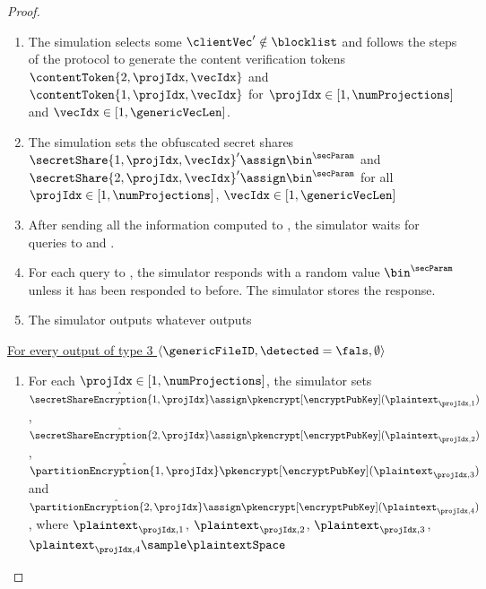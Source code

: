 \begin{proof}
\begin{enumerate}
\begin{enumerate}

\item The simulator sets $\hat{\secretShareEncryption{2, \projIdx}} \assign  \pkencrypt[\encryptPubKey](\plaintext_{\projIdx, 4})$  where $\plaintext_{\projIdx, 4} \sample \plaintextSpace$

\end{enumerate}
\item The simulation selects some $\clientVec' \notin \blocklist$ and follows the steps of the protocol to generate the content verification tokens $\contentToken{2, \projIdx, \vecIdx}$ and $\contentToken{1, \projIdx, \vecIdx}$ for $\projIdx \in [1, \numProjections]$ and $\vecIdx \in [1, \genericVecLen]$.  

\item The simulation sets the obfuscated secret shares $\secretShare{1, \projIdx, \vecIdx}' \assign \bin^{\secParam}$ and $\secretShare{2, \projIdx, \vecIdx}' \assign \bin^{\secParam}$ for all $\projIdx \in [1, \numProjections]$, $\vecIdx \in [1, \genericVecLen]$



\item After sending all the information computed to \server, the simulator waits for queries to \primeRO and \ro. 


\item For each query to \ro, the simulator responds with a random value $\bin^{\secParam}$ unless it has been responded to before. The simulator stores the response. 


\item The simulator outputs whatever \server outputs
\end{enumerate}



\smallskip\underline{For every output of type 3 $\langle \genericFileID, \detected = \fals, \emptyset \rangle$}
\begin{enumerate}


\item For each $\projIdx \in [1, \numProjections]$, the simulator sets $\hat{\secretShareEncryption{1, \projIdx}} \assign  \pkencrypt[\encryptPubKey](\plaintext_{\projIdx, 1})$, $\hat{\secretShareEncryption{2, \projIdx}} \assign  \pkencrypt[\encryptPubKey](\plaintext_{\projIdx, 2})$, 
$\hat{\partitionEncryption{1, \projIdx}}\pkencrypt[\encryptPubKey](\plaintext_{\projIdx, 3})$ and $\hat{\partitionEncryption{2, \projIdx}} \assign \pkencrypt[\encryptPubKey](\plaintext_{\projIdx, 4})$, where $\plaintext_{\projIdx, 1}$, $\plaintext_{\projIdx, 2}$, $\plaintext_{\projIdx, 3}$, $\plaintext_{\projIdx, 4} \sample \plaintextSpace$ 



\end{enumerate}
\end{proof}
